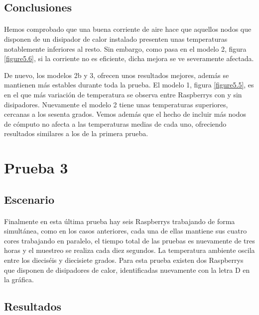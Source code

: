 \subsection{Conclusiones}
\paragraph{}

Hemos comprobado que una buena corriente de aire hace que aquellos nodos que disponen de un disipador de calor instalado presenten unas temperaturas notablemente inferiores al resto. Sin embargo, como pasa en el modelo 2, figura \ref{figure5.6}, si la corriente no es eficiente, dicha mejora se ve severamente afectada.

De nuevo, los modelos 2b y 3, ofrecen unos resultados mejores, además se mantienen más estables durante toda la prueba. El modelo 1, figura \ref{figure5.5}, es en el que más variación de temperatura se observa entre Raspberrys con y sin disipadores. Nuevamente el modelo 2 tiene unas temperaturas superiores, cercanas a los sesenta grados.
Vemos además que el hecho de incluir más nodos de cómputo no afecta a las temperaturas medias de cada uno, ofreciendo resultados similares a los de la primera prueba.

\section{Prueba 3}
\label{makereference5.5}

\subsection{Escenario}
\paragraph{}

Finalmente en esta última prueba hay seis Raspberrys trabajando de forma simultánea, como en los casos anteriores, cada una de ellas mantiene sus cuatro cores trabajando en paralelo, el tiempo total de las pruebas es nuevamente de tres horas y el muestreo se realiza cada diez segundos. La temperatura ambiente oscila entre los dieciséis y diecisiete grados. Para esta prueba existen dos Raspberrys que disponen de disipadores de calor, identificadas nuevamente con la letra D en la gráfica.

\subsection{Resultados}
